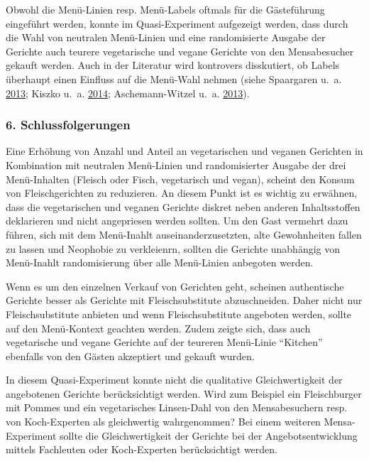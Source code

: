 \documentclass[12pt,ngerman,]{article}
\begin{document}
Obwohl die Menü-Linien resp. Menü-Labels oftmals für die Gästeführung
eingeführt werden, konnte im Quasi-Experiment aufgezeigt werden, dass
durch die Wahl von neutralen Menü-Linien und eine randomisierte Ausgabe
der Gerichte auch teurere vegetarische und vegane Gerichte von den
Mensabesucher gekauft werden. Auch in der Literatur wird kontrovers
disskutiert, ob Labels überhaupt einen Einfluss auf die Menü-Wahl nehmen
(siehe Spaargaren u.~a.
\protect\hyperlink{ref-spaargaren_consumer_2013}{2013}; Kiszko u.~a.
\protect\hyperlink{ref-kiszko_influence_2014}{2014}; Aschemann-Witzel
u.~a. \protect\hyperlink{ref-aschemann-witzel_effects_2013}{2013}).

\hypertarget{schlussfolgerungen}{%
\subsubsection{6. Schlussfolgerungen}\label{schlussfolgerungen}}

Eine Erhöhung von Anzahl und Anteil an vegetarischen und veganen
Gerichten in Kombination mit neutralen Menü-Linien und randomisierter
Ausgabe der drei Menü-Inhalten (Fleisch oder Fisch, vegetarisch und
vegan), scheint den Konsum von Fleischgerichten zu reduzieren. An diesem
Punkt ist es wichtig zu erwähnen, dass die vegetarischen und veganen
Gerichte diskret neben anderen Inhaltsstoffen deklarieren und nicht
angepriesen werden sollten. Um den Gast vermehrt dazu führen, sich mit
dem Menü-Inahlt auseinanderzusetzten, alte Gewohnheiten fallen zu lassen
und Neophobie zu verkleienrn, sollten die Gerichte unabhängig von
Menü-Inahlt randomisierung über alle Menü-Linien anbegoten werden.

\par

Wenn es um den einzelnen Verkauf von Gerichten geht, scheinen
authentische Gerichte besser als Gerichte mit Fleischsubstitute
abzuschneiden. Daher nicht nur Fleischsubstitute anbieten und wenn
Fleischsubstitute angeboten werden, sollte auf den Menü-Kontext geachten
werden. Zudem zeigte sich, dass auch vegetarische und vegane Gerichte
auf der teureren Menü-Linie ``Kitchen'' ebenfalls von den Gästen
akzeptiert und gekauft wurden.

\par

In diesem Quasi-Experiment konnte nicht die qualitative Gleichwertigkeit
der angebotenen Gerichte berücksichtigt werden. Wird zum Beispiel ein
Fleischburger mit Pommes und ein vegetarisches Linsen-Dahl von den
Mensabesuchern resp. von Koch-Experten als gleichwertig wahrgenommen?
Bei einem weiteren Mensa-Experiment sollte die Gleichwertigkeit der
Gerichte bei der Angebotsentwicklung mittels Fachleuten oder
Koch-Experten berücksichtigt werden.
\end{document}
